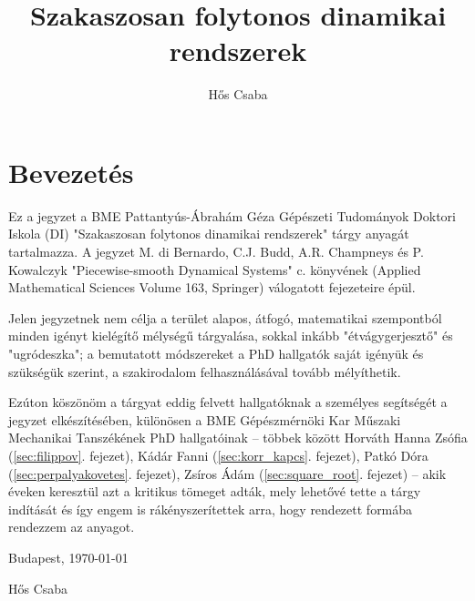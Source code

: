 \documentclass[11pt]{report}
\title{Szakaszosan folytonos dinamikai rendszerek}
\author{Hős Csaba}
\begin{document}
\maketitle			
\pagebreak
\tableofcontents
\clearpage
\pagebreak

\section*{Bevezetés}

Ez a jegyzet a BME Pattantyús-Ábrahám Géza Gépészeti Tudományok Doktori Iskola (DI) "Szakaszosan folytonos dinamikai rendszerek" tárgy anyagát tartalmazza. A jegyzet M. di Bernardo, C.J. Budd, A.R. Champneys és P. Kowalczyk "Piecewise-smooth Dynamical Systems" c. könyvének (Applied Mathematical Sciences Volume 163, Springer)  válogatott fejezeteire épül.

Jelen jegyzetnek nem célja a terület alapos, átfogó, matematikai szempontból minden igényt kielégítő mélységű tárgyalása, sokkal inkább "ét\-vágy\-ger\-jesz\-tő" és "ugródeszka"; a bemutatott módszereket a PhD hallgatók saját igényük és szükségük szerint, a szakirodalom felhasználásával tovább mélyíthetik.

Ezúton köszönöm a tárgyat eddig felvett hallgatóknak a személyes se\-gít\-sé\-gét a jegyzet elkészítésében, különösen a BME Gépészmérnöki Kar Műszaki Mechanikai Tanszékének PhD hallgatóinak -- többek között Horváth Hanna Zsófia (\ref{sec:filippov}. fejezet), Kádár Fanni (\ref{sec:korr_kapcs}. fejezet), Patkó Dóra (\ref{sec:perpalyakovetes}. fejezet), Zsíros Ádám (\ref{sec:square_root}. fejezet) --  akik éveken keresztül azt a kritikus tömeget adták, mely lehetővé tette a tárgy indítását és így engem is rákényszerítettek arra, hogy rendezett formába rendezzem az anyagot. 

\vspace{1cm}

\noindent Budapest, \today

\vspace{1cm}

\noindent Hős Csaba





%
\end{document}
